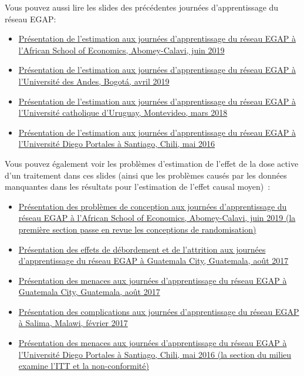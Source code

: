 \documentclass[12pt,]{book}
\begin{document}
Vous pouvez aussi lire les slides des précédentes journées d'apprentissage du réseau EGAP:

\begin{itemize}
\item
  \href{https://egap.github.io/learningdays-resources/Slides/Examples/estimation-benin.pdf}{Présentation de l'estimation aux journées d'apprentissage du réseau EGAP à l'African School of Economics, Abomey-Calavi, juin 2019}
\item
  \href{https://egap.github.io/learningdays-resources/Slides/Examples/estimation-bogota.pdf}{Présentation de l'estimation aux journées d'apprentissage du réseau EGAP à l'Université des Andes, Bogotá, avril 2019}
\item
  \href{https://egap.github.io/learningdays-resources/Slides/Examples/estimation-montevideo.pdf}{Présentation de l'estimation aux journées d'apprentissage du réseau EGAP à l'Université catholique d'Uruguay, Montevideo, mars 2018}
\item
  \href{https://egap.github.io/learningdays-resources/Slides/Examples/estimation-santiago.pdf}{Présentation de l'estimation aux journées d'apprentissage du réseau EGAP à l'Université Diego Portales à Santiago, Chili, mai 2016}
\end{itemize}

Vous pouvez également voir les problèmes d'estimation de l'effet de la dose active d'un traitement dans ces slides (ainsi que les problèmes causés par les données manquantes dans les résultats pour l'estimation de l'effet causal moyen)~:

\begin{itemize}
\item
  \href{https://egap.github.io/learningdays-resources/Slides/Examples/threats-benin.pdf}{Présentation des problèmes de conception aux journées d'apprentissage du réseau EGAP à l'African School of Economics, Abomey-Calavi, juin 2019 (la première section passe en revue les conceptions de randomisation)}
\item
  \href{https://egap.github.io/learningdays-resources/Slides/Examples/spillovers_attrition-guatemala.pdf}{Présentation des effets de débordement et de l'attrition aux journées d'apprentissage du réseau EGAP à Guatemala City, Guatemala, août 2017}
\item
  \href{https://egap.github.io/learningdays-resources/Slides/Examples/threats-guatemala.pdf}{Présentation des menaces aux journées d'apprentissage du réseau EGAP à Guatemala City, Guatemala, août 2017}
\item
  \href{https://egap.github.io/learningdays-resources/Slides/Examples/complications-malawi.pdf}{Présentation des complications aux journées d'apprentissage du réseau EGAP à Salima, Malawi, février 2017}
\item
  \href{https://egap.github.io/learningdays-resources/Slides/Examples/threats-santiago.pdf}{Présentation des menaces aux journées d'apprentissage du réseau EGAP à l'Université Diego Portales à Santiago, Chili, mai 2016 (la section du milieu examine l'ITT et la non-conformité)}
\end{itemize}
\end{document}

